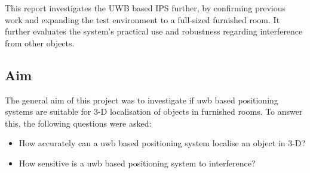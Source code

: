 		This report investigates the UWB based IPS further, by confirming previous work and expanding the test environment to a full-sized furnished room. It further evaluates the system's practical use and robustness regarding interference from other objects.

		\subsection{Aim}
		The general aim of this project was to investigate if \gls{uwb} based positioning systems are suitable for 3-D localisation of objects in furnished rooms.
		To answer this, the following questions were asked:
		\begin{itemize}	
			\item How accurately can a \gls{uwb} based positioning system localise an object in 3-D?
			\item How sensitive is a \gls{uwb} based positioning system to interference?
		\end{itemize}


\clearpage